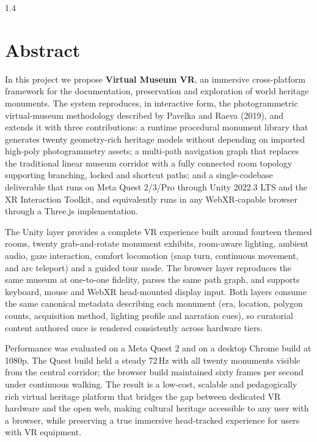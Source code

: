 \begin{spacing}{1.4}
\chapter*{Abstract}

In this project we propose \textbf{Virtual Museum VR}, an immersive cross-platform framework for the documentation, preservation and exploration of world heritage monuments. The system reproduces, in interactive form, the photogrammetric virtual-museum methodology described by Pavelka and Raeva (2019), and extends it with three contributions: a runtime procedural monument library that generates twenty geometry-rich heritage models without depending on imported high-poly photogrammetry assets; a multi-path navigation graph that replaces the traditional linear museum corridor with a fully connected room topology supporting branching, locked and shortcut paths; and a single-codebase deliverable that runs on Meta Quest 2/3/Pro through Unity 2022.3 LTS and the XR Interaction Toolkit, and equivalently runs in any WebXR-capable browser through a Three.js implementation.

The Unity layer provides a complete VR experience built around fourteen themed rooms, twenty grab-and-rotate monument exhibits, room-aware lighting, ambient audio, gaze interaction, comfort locomotion (snap turn, continuous movement, and arc teleport) and a guided tour mode. The browser layer reproduces the same museum at one-to-one fidelity, parses the same path graph, and supports keyboard, mouse and WebXR head-mounted display input. Both layers consume the same canonical metadata describing each monument (era, location, polygon counts, acquisition method, lighting profile and narration cues), so curatorial content authored once is rendered consistently across hardware tiers.

Performance was evaluated on a Meta Quest 2 and on a desktop Chrome build at 1080p. The Quest build held a steady 72\,Hz with all twenty monuments visible from the central corridor; the browser build maintained sixty frames per second under continuous walking. The result is a low-cost, scalable and pedagogically rich virtual heritage platform that bridges the gap between dedicated VR hardware and the open web, making cultural heritage accessible to any user with a browser, while preserving a true immersive head-tracked experience for users with VR equipment.

\end{spacing}
